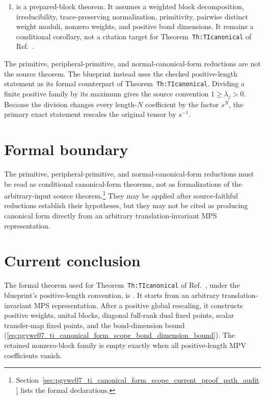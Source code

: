 \documentclass{article}
\begin{document}
\begin{enumerate}
    \item
          is a prepared-block theorem. It assumes a weighted block
          decomposition, irreducibility, trace-preserving normalization,
          primitivity, pairwise distinct weight moduli, nonzero weights, and
          positive bond dimensions. It remains a conditional corollary, not a
          citation target for Theorem~\texttt{Th:TIcanonical} of
          Ref.~\cite{PerezGarcia2007MPSReps}.
\end{enumerate}

The primitive, peripheral-primitive, and normal-canonical-form reductions are
not the source theorem. The blueprint instead uses the checked positive-length
statement as its formal counterpart of Theorem~\texttt{Th:TIcanonical}.
Dividing a finite positive family by its maximum gives the source convention
$1\geq\lambda_j>0$. Because the division changes every length-$N$ coefficient
by the factor $s^N$, the primary exact statement rescales the original tensor
by $s^{-1}$.

\section{Formal boundary}

The primitive, peripheral-primitive, and normal-canonical-form reductions must
be read as conditional canonical-form theorems, not as formalizations of the
arbitrary-input source theorem.\footnote{Section~\ref{sec:pgvwc07_ti_canonical_form_scope_current_proof_path_audit}
lists the formal declarations.}
They may be applied after source-faithful reductions establish their
hypotheses, but they may not be cited as producing canonical form directly
from an arbitrary translation-invariant MPS representation.

\section{Current conclusion}

The formal theorem used for Theorem~\texttt{Th:TIcanonical} of
Ref.~\cite{PerezGarcia2007MPSReps}, under the blueprint's positive-length
convention, is
.
It starts from an arbitrary translation-invariant MPS representation. After a
positive global rescaling, it constructs positive weights, unital blocks,
diagonal full-rank dual fixed points, scalar transfer-map fixed points, and the
bond-dimension bound
(\ref{eq:pgvwc07_ti_canonical_form_scope_bond_dimension_bound}). The retained
nonzero-block family is empty exactly when all positive-length MPV coefficients
vanish.
\end{document}
